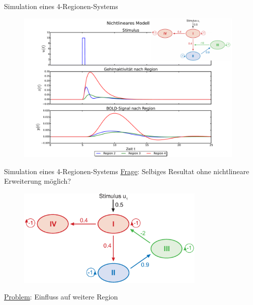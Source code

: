 \documentclass{beamer}
\begin{document}
\begin{frame}{Simulation eines 4-Regionen-Systems}
	\begin{figure}
		\vspace*{-0.33cm}
		\centering
		\includegraphics[width=0.975\textwidth]{res/hemodynamicExample1.pdf}
	\end{figure}
\end{frame}

\begin{frame}{Simulation eines 4-Regionen-Systems}
 \centering
 \colorbox{maincolor!10}{\underline{Frage}: \quad Selbiges Resultat ohne nichtlineare Erweiterung möglich?}
	\begin{figure}
		\includegraphics[width=0.8\textwidth]{res/160711Autoregulation2.eps}
	\end{figure}
 \colorbox{maincolor!10}{\underline{Problem}: \quad Einfluss auf weitere Region}
\end{frame}
\end{document}
